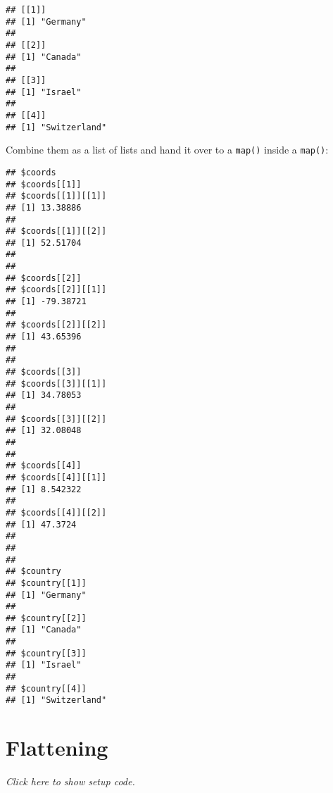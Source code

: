 \documentclass[]{book}
\newenvironment{Shaded}{\begin{snugshade}}{\end{snugshade}}
\newcommand{\DataTypeTok}[1]{\textcolor[rgb]{0.13,0.29,0.53}{#1}}
\newcommand{\DecValTok}[1]{\textcolor[rgb]{0.00,0.00,0.81}{#1}}
\newcommand{\KeywordTok}[1]{\textcolor[rgb]{0.13,0.29,0.53}{\textbf{#1}}}
\newcommand{\NormalTok}[1]{#1}
\newcommand{\OperatorTok}[1]{\textcolor[rgb]{0.81,0.36,0.00}{\textbf{#1}}}
\newcommand{\StringTok}[1]{\textcolor[rgb]{0.31,0.60,0.02}{#1}}
\begin{document}
\begin{verbatim}
## [[1]]
## [1] "Germany"
## 
## [[2]]
## [1] "Canada"
## 
## [[3]]
## [1] "Israel"
## 
## [[4]]
## [1] "Switzerland"
\end{verbatim}

Combine them as a list of lists and hand it over to a \texttt{map()} inside a \texttt{map()}:

\begin{Shaded}
\end{Shaded}

\begin{verbatim}
## $coords
## $coords[[1]]
## $coords[[1]][[1]]
## [1] 13.38886
## 
## $coords[[1]][[2]]
## [1] 52.51704
## 
## 
## $coords[[2]]
## $coords[[2]][[1]]
## [1] -79.38721
## 
## $coords[[2]][[2]]
## [1] 43.65396
## 
## 
## $coords[[3]]
## $coords[[3]][[1]]
## [1] 34.78053
## 
## $coords[[3]][[2]]
## [1] 32.08048
## 
## 
## $coords[[4]]
## $coords[[4]][[1]]
## [1] 8.542322
## 
## $coords[[4]][[2]]
## [1] 47.3724
## 
## 
## 
## $country
## $country[[1]]
## [1] "Germany"
## 
## $country[[2]]
## [1] "Canada"
## 
## $country[[3]]
## [1] "Israel"
## 
## $country[[4]]
## [1] "Switzerland"
\end{verbatim}

\hypertarget{flatten}{%
\section{Flattening}\label{flatten}}

\emph{Click here to show setup code.}

\begin{Shaded}
\end{Shaded}
\end{document}
